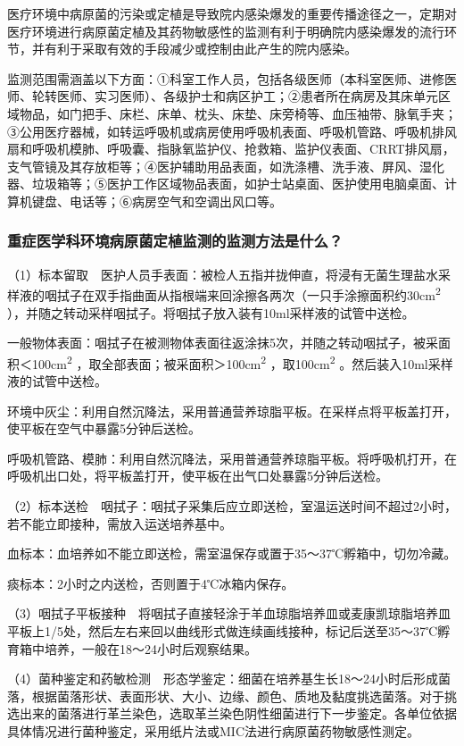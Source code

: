 医疗环境中病原菌的污染或定植是导致院内感染爆发的重要传播途径之一，定期对医疗环境进行病原菌定植及其药物敏感性的监测有利于明确院内感染爆发的流行环节，并有利于采取有效的手段减少或控制由此产生的院内感染。

监测范围需涵盖以下方面：①科室工作人员，包括各级医师（本科室医师、进修医师、轮转医师、实习医师）、各级护士和病区护工；②患者所在病房及其床单元区域物品，如门把手、床栏、床单、枕头、床垫、床旁椅等、血压袖带、脉氧手夹；③公用医疗器械，如转运呼吸机或病房使用呼吸机表面、呼吸机管路、呼吸机排风扇和呼吸机模肺、呼吸囊、指脉氧监护仪、抢救箱、监护仪表面、CRRT排风扇，支气管镜及其存放柜等；④医护辅助用品表面，如洗涤槽、洗手液、屏风、湿化器、垃圾箱等；⑤医护工作区域物品表面，如护士站桌面、医护使用电脑桌面、计算机键盘、电话等；⑥病房空气和空调出风口等。

\subsubsection{重症医学科环境病原菌定植监测的监测方法是什么？}

（1）标本留取　医护人员手表面：被检人五指并拢伸直，将浸有无菌生理盐水采样液的咽拭子在双手指曲面从指根端来回涂擦各两次（一只手涂擦面积约30cm\textsuperscript{2}
），并随之转动采样咽拭子。将咽拭子放入装有10ml采样液的试管中送检。

一般物体表面：咽拭子在被测物体表面往返涂抹5次，并随之转动咽拭子，被采面积＜100cm\textsuperscript{2}
，取全部表面；被采面积＞100cm\textsuperscript{2}
，取100cm\textsuperscript{2} 。然后装入10ml采样液的试管中送检。

环境中灰尘：利用自然沉降法，采用普通营养琼脂平板。在采样点将平板盖打开，使平板在空气中暴露5分钟后送检。

呼吸机管路、模肺：利用自然沉降法，采用普通营养琼脂平板。将呼吸机打开，在呼吸机出口处，将平板盖打开，使平板在出气口处暴露5分钟后送检。

（2）标本送检　咽拭子：咽拭子采集后应立即送检，室温运送时间不超过2小时，若不能立即接种，需放入运送培养基中。

血标本：血培养如不能立即送检，需室温保存或置于35～37℃孵箱中，切勿冷藏。

痰标本：2小时之内送检，否则置于4℃冰箱内保存。

（3）咽拭子平板接种　将咽拭子直接轻涂于羊血琼脂培养皿或麦康凯琼脂培养皿平板上1/5处，然后左右来回以曲线形式做连续画线接种，标记后送至35～37℃孵育箱中培养，一般在18～24小时后观察结果。

（4）菌种鉴定和药敏检测　形态学鉴定：细菌在培养基生长18～24小时后形成菌落，根据菌落形状、表面形状、大小、边缘、颜色、质地及黏度挑选菌落。对于挑选出来的菌落进行革兰染色，选取革兰染色阴性细菌进行下一步鉴定。各单位依据具体情况进行菌种鉴定，采用纸片法或MIC法进行病原菌药物敏感性测定。

